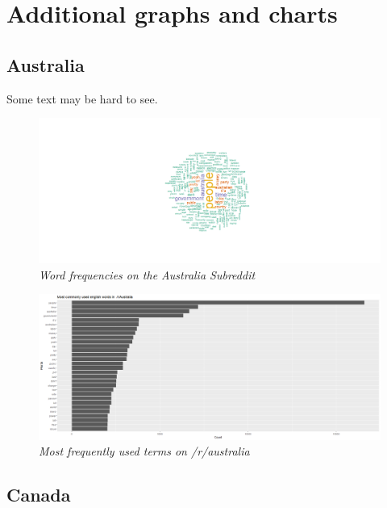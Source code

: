\chapter{Additional graphs and charts}\label{ch:AppendixB}

\section{Australia}
\label{sec:australia}
Some text may be hard to see.
\begin{figure}[ht]
    \centering
    \includegraphics[width=1.0\textwidth]{graphs/australia/wordcloud.png}
    \caption{\textit{Word frequencies on the Australia Subreddit}}
    \label{fig:australia_cloud}
\end{figure}

\begin{figure}[H]
    \centering
    \includegraphics[width=1.0\textwidth]{graphs/australia/wordfreq_canada.png}
    \caption{\textit{Most frequently used terms on /r/australia}}
    \label{fig:australia_wordfreq}
\end{figure}

\section{Canada}
\label{sec:canada}

